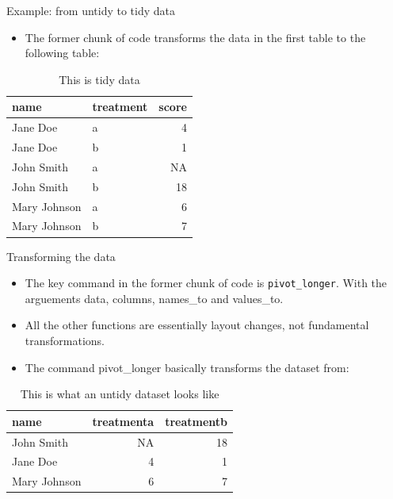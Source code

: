 \documentclass[10pt,ignorenonframetext,]{beamer}
\providecommand{\tightlist}{%
  \setlength{\itemsep}{0pt}\setlength{\parskip}{0pt}}
\begin{document}
\begin{frame}{Example: from untidy to tidy data}
\protect\hypertarget{example-from-untidy-to-tidy-data-1}{}

\begin{itemize}
\tightlist
\item
  The former chunk of code transforms the data in the first table to the
  following table:
\end{itemize}

\begin{table}

\caption{\label{tab:unnamed-chunk-4}This is tidy data}
\centering
\begin{tabular}[t]{llr}
\toprule
name & treatment & score\\
\midrule
\rowcolor{gray!6}  Jane Doe & a & 4\\
Jane Doe & b & 1\\
\rowcolor{gray!6}  John Smith & a & NA\\
John Smith & b & 18\\
\rowcolor{gray!6}  Mary Johnson & a & 6\\
\addlinespace
Mary Johnson & b & 7\\
\bottomrule
\end{tabular}
\end{table}

\end{frame}

\begin{frame}[fragile]{Transforming the data}
\protect\hypertarget{transforming-the-data}{}

\begin{itemize}
\item
  The key command in the former chunk of code is \texttt{pivot\_longer}.
  With the arguements data, columns, names\_to and values\_to.
\item
  All the other functions are essentially layout changes, not
  fundamental transformations.
\item
  The command pivot\_longer basically transforms the dataset from:
\end{itemize}

\begin{table}

\caption{\label{tab:unnamed-chunk-5}This is what an untidy dataset looks like}
\centering
\begin{tabular}[t]{lrr}
\toprule
name & treatmenta & treatmentb\\
\midrule
\rowcolor{gray!6}  John Smith & NA & 18\\
Jane Doe & 4 & 1\\
\rowcolor{gray!6}  Mary Johnson & 6 & 7\\
\bottomrule
\end{tabular}
\end{table}

\end{frame}
\end{document}
